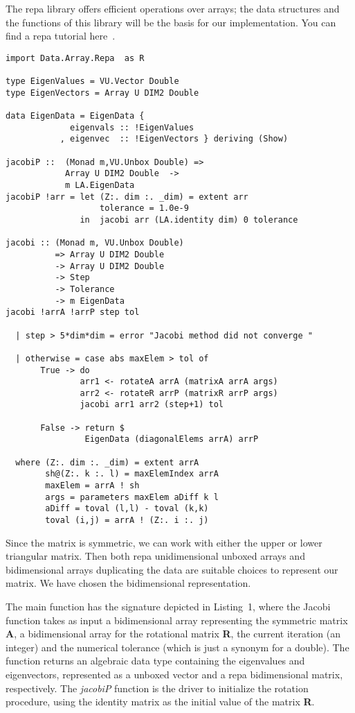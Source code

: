 \documentclass{tmr}
\begin{document}
The repa library offers efficient operations over arrays; the data
structures and the functions of this library will be the basis for our
implementation.
%
You can find a repa tutorial here~\cite{repa}.

\begin{lstlisting}[float,captionpos=b,belowcaptionskip=4pt, caption= Jacobi Method]
import Data.Array.Repa  as R

type EigenValues = VU.Vector Double
type EigenVectors = Array U DIM2 Double

data EigenData = EigenData {
             eigenvals :: !EigenValues
           , eigenvec  :: !EigenVectors } deriving (Show)

jacobiP ::  (Monad m,VU.Unbox Double) =>
            Array U DIM2 Double  ->
            m LA.EigenData
jacobiP !arr = let (Z:. dim :. _dim) = extent arr
                   tolerance = 1.0e-9
               in  jacobi arr (LA.identity dim) 0 tolerance

jacobi :: (Monad m, VU.Unbox Double)
          => Array U DIM2 Double
          -> Array U DIM2 Double
          -> Step
          -> Tolerance
          -> m EigenData
jacobi !arrA !arrP step tol

  | step > 5*dim*dim = error "Jacobi method did not converge "

  | otherwise = case abs maxElem > tol of
       True -> do
               arr1 <- rotateA arrA (matrixA arrA args)
               arr2 <- rotateR arrP (matrixR arrP args)
               jacobi arr1 arr2 (step+1) tol

       False -> return $
                EigenData (diagonalElems arrA) arrP

  where (Z:. dim :. _dim) = extent arrA
        sh@(Z:. k :. l) = maxElemIndex arrA
        maxElem = arrA ! sh
        args = parameters maxElem aDiff k l
        aDiff = toval (l,l) - toval (k,k)
        toval (i,j) = arrA ! (Z:. i :. j)
\end{lstlisting}

Since the matrix is symmetric, we can work with either the upper or
lower triangular matrix.
%
Then both repa unidimensional unboxed arrays and bidimensional arrays
duplicating the data are suitable choices to represent our matrix.
%
We have chosen the bidimensional representation.

The main function has the signature depicted in Listing~1,
where the Jacobi function takes as input a bidimensional array
representing the symmetric matrix {\textbf A}, a bidimensional array for
the rotational matrix {\textbf R}, the current iteration (an integer) and
the numerical tolerance (which is just a synonym for a double).
%
The function returns an algebraic data type containing the eigenvalues
and eigenvectors, represented as a unboxed vector and a repa
bidimensional matrix, respectively.
%
The \textit{jacobiP} function is the driver to initialize the rotation
procedure, using the identity matrix as the initial value of the matrix
\textbf{R}.
\end{document}
